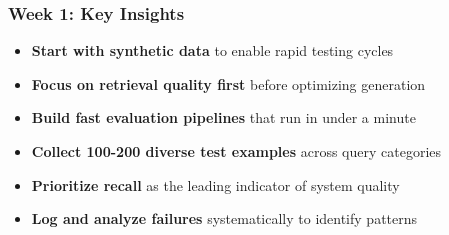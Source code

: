 \begin{frame}
    \frametitle{Week 1: Key Insights}
    
    \begin{center}
    \end{center}
    
    \begin{itemize}
        \item \textbf{Start with synthetic data} to enable rapid testing cycles
        \item \textbf{Focus on retrieval quality first} before optimizing generation
        \item \textbf{Build fast evaluation pipelines} that run in under a minute
        \item \textbf{Collect 100-200 diverse test examples} across query categories
        \item \textbf{Prioritize recall} as the leading indicator of system quality
        \item \textbf{Log and analyze failures} systematically to identify patterns
    \end{itemize}
    
    \begin{center}
    \end{center}
\end{frame}

